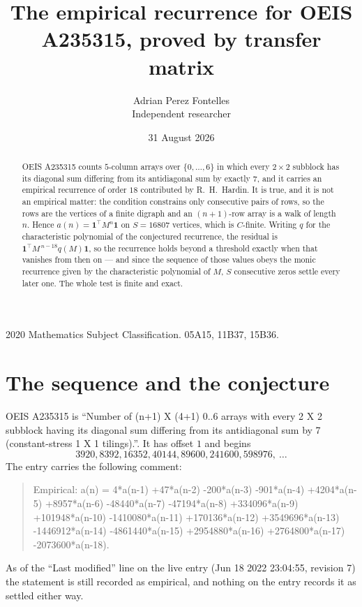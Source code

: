 \documentclass[11pt,a4paper]{article}
\title{The empirical recurrence for OEIS A235315, proved by transfer matrix}
\author{Adrian Perez Fontelles\\ \small Independent researcher}
\date{31 August 2026}
\theoremstyle{plain}
\theoremstyle{definition}
\begin{document}
\maketitle

\begin{abstract}
OEIS A235315 counts $5$-column arrays over $\{0,\dots,6\}$ in which every
$2\times2$ subblock has its diagonal sum differing from its antidiagonal sum by
exactly $7$, and it
carries an empirical recurrence of order $18$ contributed by R.~H.~Hardin. It is true,
and it is not an empirical matter: the condition constrains only consecutive pairs of rows,
so the rows are the vertices of a finite digraph and an $(n+1)$-row array is a walk of
length $n$. Hence $a(n)=\mathbf{1}^{\!\top}M^{n}\mathbf{1}$ on $S=16807$ vertices, which
is $C$-finite. Writing $q$ for the characteristic polynomial of the conjectured recurrence,
the residual is $\mathbf{1}^{\!\top}M^{\,n-18}q(M)\mathbf{1}$, so the recurrence
holds beyond a threshold exactly when that vanishes from then on --- and since the sequence
of those values obeys the monic recurrence given by the characteristic polynomial of $M$,
$S$ consecutive zeros settle every later one. The whole test is finite and exact.
\end{abstract}

\noindent\small 2020 Mathematics Subject Classification. 05A15, 11B37, 15B36.\normalsize

\section{The sequence and the conjecture}

OEIS A235315 is ``Number of (n+1) X (4+1) 0..6 arrays with every 2 X 2 subblock having its diagonal sum differing from its antidiagonal sum by 7 (constant-stress 1 X 1 tilings).''. It has offset
$1$ and begins
\[
3920, 8392, 16352, 40144, 89600, 241600, 598976,\ \dots
\]
The entry carries the following comment:
\begin{quote}\small
Empirical: a(n) = 4*a(n-1) +47*a(n-2) -200*a(n-3) -901*a(n-4) +4204*a(n-5) +8957*a(n-6) -48440*a(n-7) -47194*a(n-8) +334096*a(n-9) +101948*a(n-10) -1410080*a(n-11) +170136*a(n-12) +3549696*a(n-13) -1446912*a(n-14) -4861440*a(n-15) +2954880*a(n-16) +2764800*a(n-17) -2073600*a(n-18).
\end{quote}
As of the ``Last modified'' line on the live entry (Jun 18 2022 23:04:55, revision 7) the statement is
still recorded as empirical, and nothing on the entry records it as settled either way.
\end{document}
